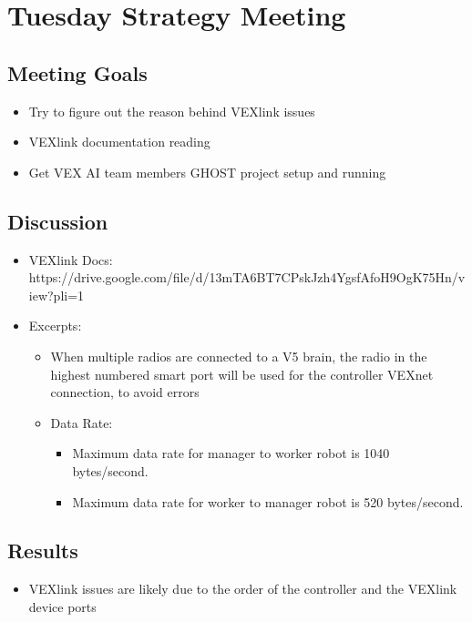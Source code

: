 \section{Tuesday Strategy Meeting}

\subsection{Meeting Goals}
\begin{itemize}
    \item Try to figure out the reason behind VEXlink issues
    \item VEXlink documentation reading
    \item Get VEX AI team members GHOST project setup and running
\end{itemize}

\subsection{Discussion}
\begin{itemize}
    \item VEXlink Docs: https://drive.google.com/file/d/13mTA6BT7CPskJzh4YgsfAfoH9OgK75Hn/view?pli=1
    \item Excerpts:
    \begin{itemize}
        \item When multiple radios are connected to a V5 brain, the radio in the highest numbered smart port will be used for the controller VEXnet connection, to avoid errors
        \item Data Rate:
        \begin{itemize}
            \item Maximum data rate for manager to worker robot is 1040 bytes/second.
            \item Maximum data rate for worker to manager robot is 520 bytes/second.
        \end{itemize}
    \end{itemize}
\end{itemize}

\subsection{Results}
\begin{itemize}
    \item VEXlink issues are likely due to the order of the controller and the VEXlink device ports
\end{itemize}

